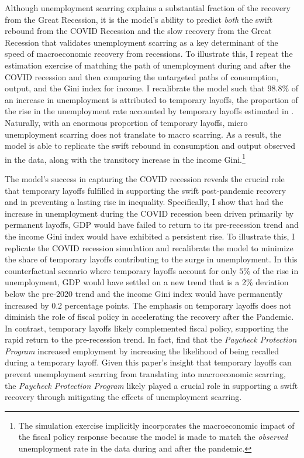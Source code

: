  Although unemployment scarring explains a substantial fraction of the recovery from the Great Recession, it is the model's ability to predict \textit{both} the swift rebound from the COVID Recession and the slow recovery from the Great Recession that validates unemployment scarring as a key determinant of the speed of macroeconomic recovery from recessions. To illustrate this, I repeat the estimation exercise of matching the path of unemployment during and after the COVID recession and then comparing the untargeted paths of consumption, output, and the Gini index for income. I recalibrate the model such that $98.8\%$ of an increase in unemployment is attributed to temporary layoffs, the proportion of the rise in the unemployment rate accounted by temporary layoffs estimated in \cite{Gertler2022}. Naturally, with an enormous proportion of temporary layoffs, micro unemployment scarring does not translate to macro scarring.  As a result, the model is able to replicate the swift rebound in consumption and output observed in the data, along with the transitory increase in the income Gini.\footnote{The simulation exercise implicitly incorporates the macroeconomic impact of the fiscal policy response because the model is made to match the \textit{observed} unemployment rate in the data during and after the pandemic.} 

The model's success in capturing the COVID recession reveals the crucial role that temporary layoffs fulfilled in supporting the swift post-pandemic recovery and in preventing a lasting rise in inequality. Specifically, I show that had the increase in unemployment during the COVID recession been driven primarily by permanent layoffs, GDP would have failed to return to its pre-recession trend and the income Gini index would have exhibited a persistent rise. To illustrate this, I replicate the COVID recession simulation and recalibrate the model to minimize the share of temporary layoffs contributing to the surge in unemployment. In this counterfactual scenario where temporary layoffs account for only $5\%$ of the rise in unemployment, GDP would have settled on a new trend that is a 2$\%$ deviation below the pre-2020 trend and the income Gini index would have permanently increased by 0.2 percentage points. The emphasis on temporary layoffs does not diminish the role of fiscal policy in accelerating the recovery after the Pandemic. In contrast, temporary layoffs likely complemented fiscal policy, supporting the rapid return to the pre-recession trend. In fact, \cite{Gertler2022} find that the \textit{Paycheck Protection Program} increased employment by increasing the likelihood of being recalled during a temporary layoff. Given this paper's insight that temporary layoffs can prevent unemployment scarring from translating into macroeconomic scarring, the \textit{Paycheck Protection Program} likely played a crucial role in supporting a swift recovery through mitigating the effects of unemployment scarring.


